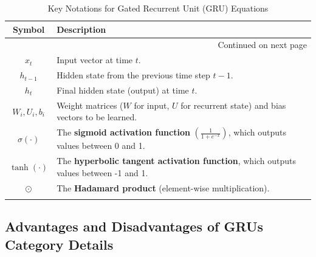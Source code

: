 \begin{center}
\begin{longtable}{|c|p{}|}
\hline
\textbf{Symbol} & \textbf{Description} \\
\hline
\endhead %

\hline
\multicolumn{2}{|r|}{{Continued on next page}} \\
\hline
\endfoot %

\hline
\endlastfoot %

$x_t$ & Input vector at time $t$. \\
\hline
$h_{t-1}$ & Hidden state from the previous time step $t-1$. \\
\hline
$h_t$ & Final hidden state (output) at time $t$. \\
\hline
$W_i, U_i, b_i$ & Weight matrices ($W$ for input, $U$ for recurrent state) and bias vectors to be learned. \\
\hline
$\sigma(\cdot)$ & The \textbf{sigmoid activation function} $(\frac{1}{1 + e^{-x}})$, which outputs values between 0 and 1. \\
\hline
$\tanh(\cdot)$ & The \textbf{hyperbolic tangent activation function}, which outputs values between -1 and 1. \\
\hline
$\odot$ & The \textbf{Hadamard product} (element-wise multiplication). \\
\hline
\caption{Key Notations for Gated Recurrent Unit (GRU) Equations}
\label{tab:gru_notation}
\end{longtable}
\end{center}


\FloatBarrier

\subsection{Advantages and Disadvantages of GRUs
Category	Details}


